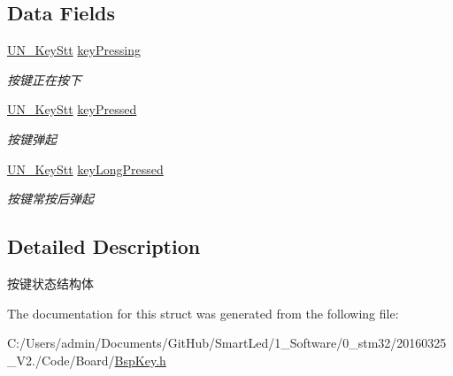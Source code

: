 \subsection*{\-Data \-Fields}
\begin{DoxyCompactItemize}
\item 
\hypertarget{struct_s_t_r___key_af19b472d62ae5609b5c3292753a76c87}{\hyperlink{union_u_n___key_stt}{\-U\-N\-\_\-\-Key\-Stt} \hyperlink{struct_s_t_r___key_af19b472d62ae5609b5c3292753a76c87}{key\-Pressing}}\label{struct_s_t_r___key_af19b472d62ae5609b5c3292753a76c87}

\begin{DoxyCompactList}\small\item\em 按键正在按下 \end{DoxyCompactList}\item 
\hypertarget{struct_s_t_r___key_a32e9b226cd87c3f95df07f5095359bb3}{\hyperlink{union_u_n___key_stt}{\-U\-N\-\_\-\-Key\-Stt} \hyperlink{struct_s_t_r___key_a32e9b226cd87c3f95df07f5095359bb3}{key\-Pressed}}\label{struct_s_t_r___key_a32e9b226cd87c3f95df07f5095359bb3}

\begin{DoxyCompactList}\small\item\em 按键弹起 \end{DoxyCompactList}\item 
\hypertarget{struct_s_t_r___key_aaf45faf796194c4c505c4954ca043a52}{\hyperlink{union_u_n___key_stt}{\-U\-N\-\_\-\-Key\-Stt} \hyperlink{struct_s_t_r___key_aaf45faf796194c4c505c4954ca043a52}{key\-Long\-Pressed}}\label{struct_s_t_r___key_aaf45faf796194c4c505c4954ca043a52}

\begin{DoxyCompactList}\small\item\em 按键常按后弹起 \end{DoxyCompactList}\end{DoxyCompactItemize}


\subsection{\-Detailed \-Description}
按键状态结构体 

\-The documentation for this struct was generated from the following file\-:\begin{DoxyCompactItemize}
\item 
\-C\-:/\-Users/admin/\-Documents/\-Git\-Hub/\-Smart\-Led/1\-\_\-\-Software/0\-\_\-stm32/20160325\-\_\-\-V2./\-Code/\-Board/\hyperlink{_bsp_key_8h}{\-Bsp\-Key.\-h}\end{DoxyCompactItemize}
